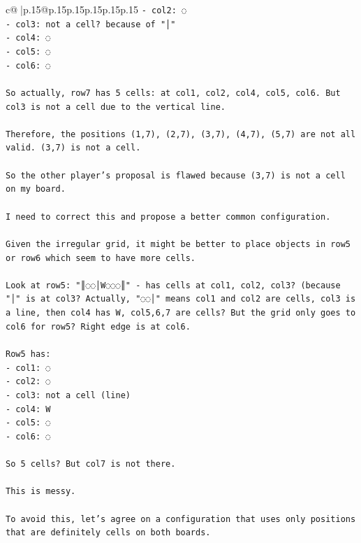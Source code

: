 \documentclass{article}
\begin{document}
{\begin{supertabular}{c@{$\;$}|p{.15\linewidth}@{}p{.15\linewidth}p{.15\linewidth}p{.15\linewidth}p{.15\linewidth}p{.15\linewidth}}
{{{\texttt{{-} col2: ◌} \\
\texttt{{-} col3: not a cell? because of "│"} \\
\texttt{{-} col4: ◌} \\
\texttt{{-} col5: ◌} \\
\texttt{{-} col6: ◌} \\
\\ 
\texttt{So actually, row7 has 5 cells: at col1, col2, col4, col5, col6. But col3 is not a cell due to the vertical line.} \\
\\ 
\texttt{Therefore, the positions (1,7), (2,7), (3,7), (4,7), (5,7) are not all valid. (3,7) is not a cell.} \\
\\ 
\texttt{So the other player's proposal is flawed because (3,7) is not a cell on my board.} \\
\\ 
\texttt{I need to correct this and propose a better common configuration.} \\
\\ 
\texttt{Given the irregular grid, it might be better to place objects in row5 or row6 which seem to have more cells.} \\
\\ 
\texttt{Look at row5: "║◌◌│W◌◌◌║" {-} has cells at col1, col2, col3? (because "│" is at col3? Actually, "◌◌│" means col1 and col2 are cells, col3 is a line, then col4 has W, col5,6,7 are cells? But the grid only goes to col6 for row5? Right edge is at col6.} \\
\\ 
\texttt{Row5 has:} \\
\texttt{{-} col1: ◌} \\
\texttt{{-} col2: ◌} \\
\texttt{{-} col3: not a cell (line)} \\
\texttt{{-} col4: W} \\
\texttt{{-} col5: ◌} \\
\texttt{{-} col6: ◌} \\
\\ 
\texttt{So 5 cells? But col7 is not there.} \\
\\ 
\texttt{This is messy.} \\
\\ 
\texttt{To avoid this, let's agree on a configuration that uses only positions that are definitely cells on both boards.} \\
\\ 
}}}
\end{supertabular}}
\end{document}
